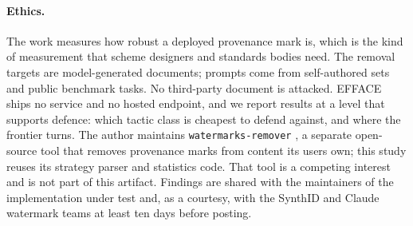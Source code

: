 \paragraph{Ethics.}
The work measures how robust a deployed provenance mark is, which is the kind of measurement that scheme designers and standards bodies need. The removal targets are model-generated documents; prompts come from self-authored sets and public benchmark tasks. No third-party document is attacked. EFFACE ships no service and no hosted endpoint, and we report results at a level that supports defence: which tactic class is cheapest to defend against, and where the frontier turns. The author maintains \texttt{watermarks-remover} \citep{watermarksremover}, a separate open-source tool that removes provenance marks from content its users own; this study reuses its strategy parser and statistics code. That tool is a competing interest and is not part of this artifact. Findings are shared with the maintainers of the implementation under test and, as a courtesy, with the SynthID and Claude watermark teams at least ten days before posting.
